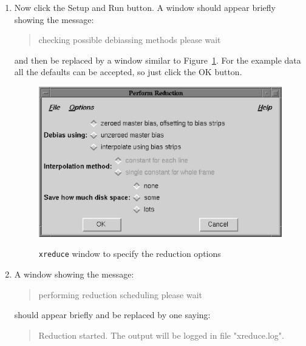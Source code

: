 \documentclass[twoside,11pt]{article}
\begin{document}
\begin{enumerate}
  \begin{quote}
   {\sf Setting data descriptions, please wait}
  \end{quote}

   and you will be returned to the {\tt xreduce} main window.

  \item Now click the {\sf Setup and Run} button.  A window should appear
   briefly showing the message:

  \begin{quote}
   {\sf checking possible debiassing methods please wait}
  \end{quote}

   and then be replaced by a window similar to Figure~\ref{PERFORMREDUCTION}.
   For the example data all the defaults can be accepted, so just click the
   {\sf OK} button.

  \begin{figure}[htbp]
     \centering 
      \includegraphics[totalheight=3in]{sc5_performreduction.ps}
      \begin{quote}
      \caption{{\tt xreduce} window to specify the reduction options
      \label{PERFORMREDUCTION} }
      \end{quote}
  \end{figure}

  \item A window showing the message:

  \begin{quote}
   {\sf performing reduction scheduling please wait}
  \end{quote}

   should appear briefly and be replaced by one saying:

  \begin{quote}
   {\sf Reduction started.  The output will be logged in file
   "xreduce.log".}
  \end{quote}


\end{enumerate}
\end{document}
